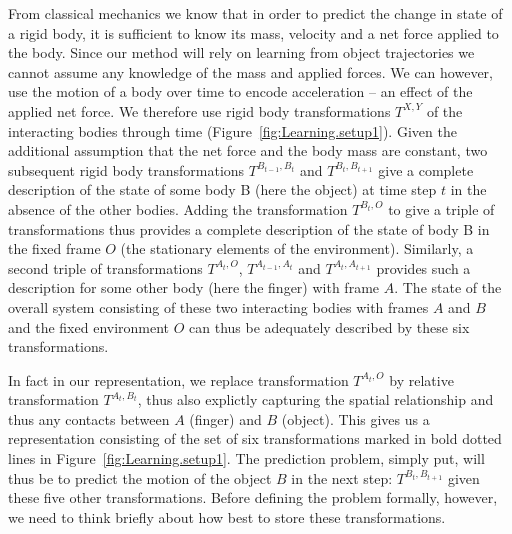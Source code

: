 From classical mechanics we know that in order to predict the change
in state of a rigid body, it is sufficient to know its mass, velocity
and a net force applied to the body.  Since our method will rely on
learning from object trajectories we cannot assume any knowledge of
the mass and applied forces. We can however, use the motion of a body over time to encode acceleration -- an effect of the applied net
force. We therefore use rigid body transformations $T^{X,Y}$ of the interacting bodies through time (Figure~\ref{fig:Learning.setup1}). Given the additional assumption that the net force and the body mass are constant, two subsequent rigid body transformations $T^{B_{t-1},
  B_{t}}$ and $T^{B_{t},B_{t+1}}$ give a complete description of the
state of some body B (here the object) at time step $t$ in the absence
of the other bodies.  Adding the transformation $T^{B_t, O}$ to give a
triple of transformations thus provides a complete description of the
state of body B in the fixed frame $O$ (the stationary elements of the
environment).  Similarly, a second triple of transformations $T^{A_t,
  O}$, $T^{A_{t-1}, A_{t}}$ and $T^{A_{t}, A_{t+1}}$ provides such a
description for some other body (here the finger) with frame $A$. 
The state of the overall system consisting of these two interacting
bodies with frames $A$ and $B$ and the fixed environment $O$ can
thus be adequately described by these six transformations.

In fact in our representation, we replace transformation $T^{A_t, O}$ by relative transformation $T^{A_t, B_t}$, thus also explictly capturing the spatial relationship and thus any contacts between $A$ (finger) and $B$ (object). This gives us a representation consisting of the set of six transformations marked in bold dotted lines in Figure~\ref{fig:Learning.setup1}. The prediction problem, simply put, will thus be to predict the motion of the object $B$ in the next step: $T^{B_t,B_{t+1}}$ given these five other transformations. Before defining the problem formally, however, we need to think briefly about how best to store these transformations.



